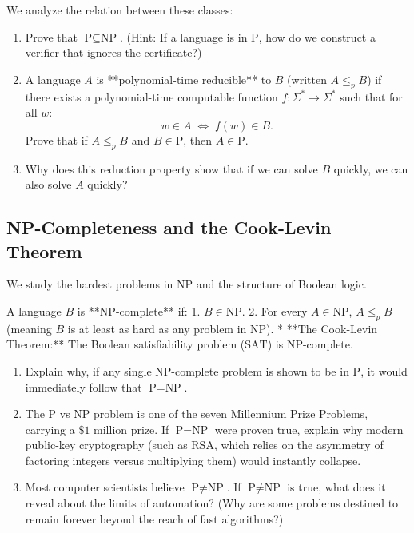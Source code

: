 \documentclass[12pt, a4paper]{book}
\begin{document}
\begin{explobox}
We analyze the relation between these classes:
\begin{enumerate}[label=(\alph*), leftmargin=*]
  \item Prove that $\text{P} \subseteq \text{NP}$. (Hint: If a language is in $\text{P}$, how do we construct a verifier that ignores the certificate?)
  \item A language $A$ is **polynomial-time reducible** to $B$ (written $A \le_p B$) if there exists a polynomial-time computable function $f: \Sigma^* \to \Sigma^*$ such that for all $w$:
        \[
          w \in A \;\iff\; f(w) \in B.
        \]
        Prove that if $A \le_p B$ and $B \in \text{P}$, then $A \in \text{P}$.
  \item Why does this reduction property show that if we can solve $B$ quickly, we can also solve $A$ quickly?
\end{enumerate}
\end{explobox}

\subsection{NP-Completeness and the Cook-Levin Theorem}

We study the hardest problems in $\text{NP}$ and the structure of Boolean logic.

\begin{explobox}
A language $B$ is **NP-complete** if:
1. $B \in \text{NP}$.
2. For every $A \in \text{NP}$, $A \le_p B$ (meaning $B$ is at least as hard as any problem in $\text{NP}$).
* **The Cook-Levin Theorem:** The Boolean satisfiability problem ($\text{SAT}$) is NP-complete.
\begin{enumerate}[label=(\alph*), leftmargin=*]
  \item Explain why, if any single NP-complete problem is shown to be in $\text{P}$, it would immediately follow that $\text{P} = \text{NP}$.
  \item The $\text{P}$ vs $\text{NP}$ problem is one of the seven Millennium Prize Problems, carrying a $\$1$ million prize.
        If $\text{P} = \text{NP}$ were proven true, explain why modern public-key cryptography (such as RSA, which relies on the asymmetry of factoring integers versus multiplying them) would instantly collapse.
  \item Most computer scientists believe $\text{P} \neq \text{NP}$.
        If $\text{P} \neq \text{NP}$ is true, what does it reveal about the limits of automation? (Why are some problems destined to remain forever beyond the reach of fast algorithms?)
\end{enumerate}
\end{explobox}
\end{document}
